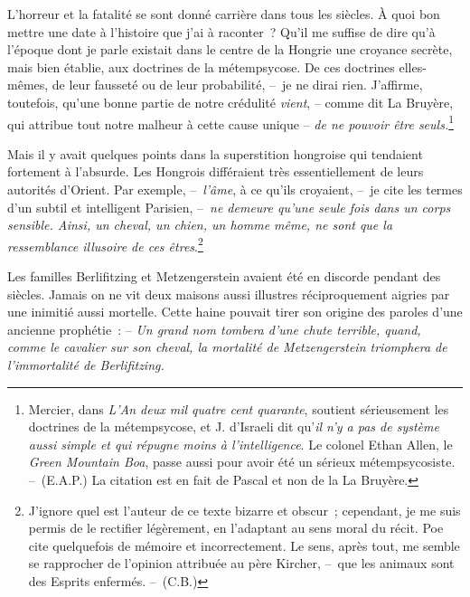 \documentclass[french,twoside]{book} %
\newcommand{\bibl}[1]{{\RaggedLeft{#1}\par\bigskip}}
\begin{document}
\bibl{Martin Luther.}
\noindent L’horreur et la fatalité se sont donné carrière dans tous les siècles. À quoi bon mettre une date à l’histoire que j’ai à raconter ? Qu’il me suffise de dire qu’à l’époque dont je parle existait dans le centre de la Hongrie une croyance secrète, mais bien établie, aux doctrines de la métempsycose. De ces doctrines elles-mêmes, de leur fausseté ou de leur probabilité, – je ne dirai rien. J’affirme, toutefois, qu’une bonne partie de notre crédulité \emph{vient}, – comme dit La Bruyère, qui attribue tout notre malheur à cette cause unique – \emph{de ne pouvoir être seuls.}\footnote{Mercier, dans \emph{L’An deux mil quatre cent quarante}, soutient sérieusement les doctrines de la métempsycose, et J. d’Israeli dit qu’\emph{il n’y a pas de système aussi simple et qui répugne moins à l’intelligence}. Le colonel Ethan Allen, le \emph{Green Mountain Boa}, passe aussi pour avoir été un sérieux métempsycosiste. – (E.A.P.) La citation est en fait de Pascal et non de la La Bruyère.}\par
Mais il y avait quelques points dans la superstition hongroise qui tendaient fortement à l’absurde. Les Hongrois différaient très essentiellement de leurs autorités d’Orient. Par exemple, – \emph{l’âme}, à ce qu’ils croyaient, – je cite les termes d’un subtil et intelligent Parisien, – \emph{ne demeure qu’une seule fois dans un corps sensible. Ainsi, un cheval, un chien, un homme même, ne sont que la ressemblance illusoire de ces êtres}.\footnote{J’ignore quel est l’auteur de ce texte bizarre et obscur ; cependant, je me suis permis de le rectifier légèrement, en l’adaptant au sens moral du récit. Poe cite quelquefois de mémoire et incorrectement. Le sens, après tout, me semble se rapprocher de l’opinion attribuée au père Kircher, – que les animaux sont des Esprits enfermés. – (C.B.)}\par
Les familles Berlifitzing et Metzengerstein avaient été en discorde pendant des siècles. Jamais on ne vit deux maisons aussi illustres réciproquement aigries par une inimitié aussi mortelle. Cette haine pouvait tirer son origine des paroles d’une ancienne prophétie : – \emph{Un grand nom tombera d’une chute terrible, quand, comme le cavalier sur son cheval, la mortalité de Metzengerstein triomphera de l’immortalité de Berlifitzing.}\par
\end{document}
